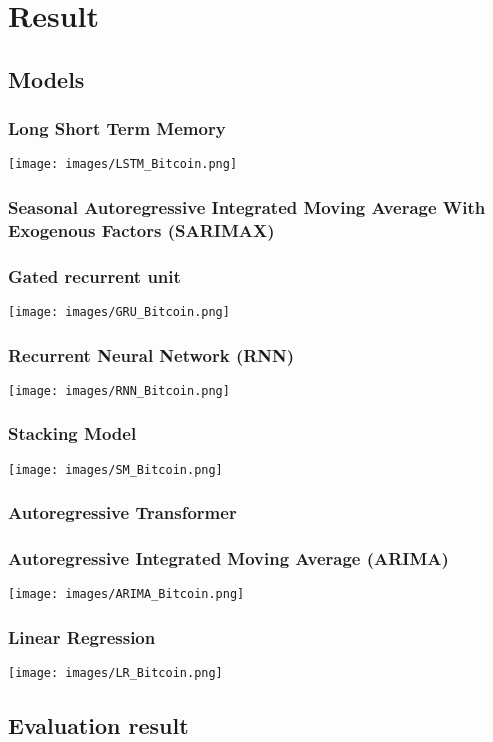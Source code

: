 \documentclass{ieeeojies}
\begin{document}
\section{Result}
\subsection{Models}
\subsubsection{Long Short Term Memory}
\texttt{[image: images/LSTM\_Bitcoin.png]}
\subsubsection{Seasonal Autoregressive Integrated
Moving Average With Exogenous Factors
(SARIMAX)}
\subsubsection{Gated recurrent unit}
\texttt{[image: images/GRU\_Bitcoin.png]}
\subsubsection{Recurrent Neural Network (RNN)}
\texttt{[image: images/RNN\_Bitcoin.png]}
\subsubsection{Stacking Model}
\texttt{[image: images/SM\_Bitcoin.png]}
\subsubsection{Autoregressive Transformer}
\subsubsection{Autoregressive Integrated Moving Average (ARIMA)}
\texttt{[image: images/ARIMA\_Bitcoin.png]}
\subsubsection{Linear Regression}
\texttt{[image: images/LR\_Bitcoin.png]}
\subsection{Evaluation result}
\end{document}
